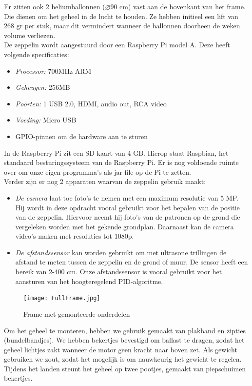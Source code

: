 \documentclass[eind]{penoverslag}
\begin{document}
Er zitten ook 2 heliumballonnen ($\diameter$90 cm) vast aan de bovenkant van het frame. Die dienen om het geheel in de lucht te houden. Ze hebben initieel een lift van 268 gr per stuk, maar dit vermindert wanneer de ballonnen doorheen de weken volume verliezen. \\

De zeppelin wordt aangestuurd door een Raspberry Pi model A. Deze heeft volgende specificaties:
\begin{itemize}
\item \emph{Processor:} 700MHz ARM
\item \emph{Geheugen:} 256MB
\item \emph{Poorten:} 1 USB 2.0, HDMI, audio out, RCA video
\item \emph{Voeding:} Micro USB
\item GPIO-pinnen om de hardware aan te sturen
\end{itemize}

In de Raspberry Pi zit een SD-kaart van 4 GB. Hierop staat Raspbian, het standaard besturingssysteem van de Raspberry Pi. Er is nog voldoende ruimte over om onze eigen programma's als jar-file op de Pi te zetten. \\

Verder zijn er nog 2 apparaten waarvan de zeppelin gebruik maakt:
\begin{itemize}
\item \emph{De camera} laat toe foto's te nemen met een maximum resolutie van 5 MP. Hij wordt in deze opdracht vooral gebruikt voor het bepalen van de positie van de zeppelin. Hiervoor neemt hij foto's van de patronen op de grond die vergeleken worden met het gekende grondplan. Daarnaast kan de camera video's maken met resoluties tot 1080p.

\item \emph{De afstandssensor} kan worden gebruikt om met ultrasone trillingen de afstand te meten tussen de zeppelin en de grond of muur. De sensor heeft een bereik van 2-400 cm. Onze afstandssensor is vooral gebruikt voor het aansturen van het hoogteregelend PID-algoritme.  \\
\end{itemize}

\begin{figure}[ht!]
\centering
\texttt{[image: FullFrame.jpg]}
\caption{Frame met gemonteerde onderdelen}
\label{zeppFrame}
\end{figure}

Om het geheel te monteren, hebben we gebruik gemaakt van plakband en zipties (bundelbandjes). We hebben bekertjes bevestigd om ballast te dragen, zodat het geheel lichtjes zakt wanneer de motor geen kracht naar boven zet. Als gewicht gebruiken we zout, zodat het mogelijk is om nauwkeurig het gewicht te regelen. Tijdens het landen steunt het geheel op twee pootjes, gemaakt van piepschuimen bekertjes. \\
\end{document}
